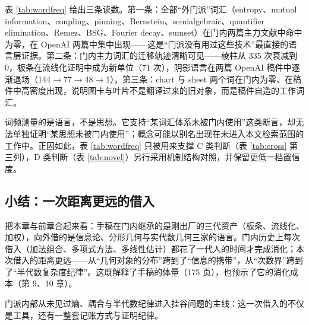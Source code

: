 表 \ref{tab:wordfreq} 给出三条读数。第一条：全部“外门派”词汇（entropy、mutual information、coupling、pinning、Bernstein、semialgebraic、quantifier elimination、Remez、BSG、Fourier decay、sumset）在门内两篇主力文献中命中为零，在 OpenAI 两篇中集中出现——这是“门派没有用过这些技术”最直接的语言层证据。第二条：门内主力词汇的迁移轨迹清晰可见——棱柱从 335 次衰减到 0，板条在流线化证明中成为新单位（71 次），阴影语言在两篇 OpenAI 稿件中逐渐退场（144$\to$77$\to$48$\to$1）。第三条：chart 与 sheet 两个词在门内为零、在稿件中高密度出现，说明图卡与叶片不是翻译过来的旧对象，而是稿件自造的工作词汇。

\begin{cautbox}[词频证据的限度]
词频测量的是语言，不是思想。它支持“某词汇体系未被门内使用”这类断言，却无法单独证明“某思想未被门内使用”；概念可能以别名出现在未进入本文检索范围的工作中。正因如此，表 \ref{tab:wordfreq} 只被用来支撑 C 类判断（表 \ref{tab:cross} 第三列），D 类判断（表 \ref{tab:novel}）另行采用机制结构对照，并保留更低一档置信度。
\end{cautbox}

\subsection{小结：一次距离更远的借入}

把本章与前章合起来看：手稿在门内继承的是刚出厂的三代资产（板条、流线化、加权），向外借的是信息论、分形几何与实代数几何三家的语言。门内历史上每次借入（加法组合、多项式方法、多线性估计）都花了一代人的时间才完成消化；本次借入的距离更远——从“几何对象的分布”跨到了“信息的携带”，从“次数界”跨到了“半代数复杂度纪律”。这既解释了手稿的体量（175 页），也预示了它的消化成本（第 9、10 章）。

\begin{keybox}[可记忆主句]
门派内部从未见过熵、耦合与半代数纪律进入挂谷问题的主线：这一次借入的不仅是工具，还有一整套记账方式与证明纪律。
\end{keybox}